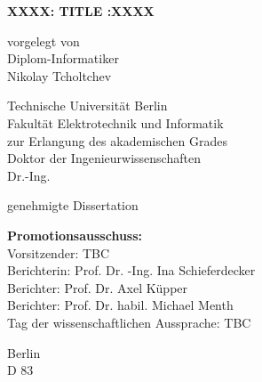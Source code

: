 

\begin{center}

{
    \textsf{}
}

\vspace{1cm}

{
    \Large
	\bf
    \textsf{XXXX: TITLE :XXXX} \par }

\vspace{2cm}

{
    \large
    vorgelegt von \\
    Diplom-Informatiker \\
    Nikolay Tcholtchev
    \medskip
}

\vspace{3cm}


{

    \textsf{Technische Universit\"{a}t Berlin \\
						Fakult\"{a}t Elektrotechnik und Informatik \\
        \medskip
						zur Erlangung des akademischen Grades \\ 
            Doktor der Ingenieurwissenschaften \\
										Dr.-Ing.
		    \medskip
            }
    \par
}
            genehmigte Dissertation


\end{center}

\begin{flushleft}

\vspace{2cm}

{
    \textsf{\textbf{Promotionsausschuss:}} 
    \\ 
    \medskip
    \textsf{Vorsitzender: TBC}
    \\
	\textsf{Berichterin: Prof. Dr. -Ing. Ina Schieferdecker}
	\\ 
	\textsf{Berichter: Prof. Dr. Axel Küpper}
	\\ 
	\textsf{Berichter: Prof. Dr. habil. Michael Menth}
  \\ 
    \medskip
    \medskip
    \textsf{Tag der wissenschaftlichen Aussprache: TBC}
}


\end{flushleft}

\begin{center}

\vspace{1cm}
{
    \large
    Berlin \the\year \\
    \medskip
    D 83
    \medskip
}

\end{center}
